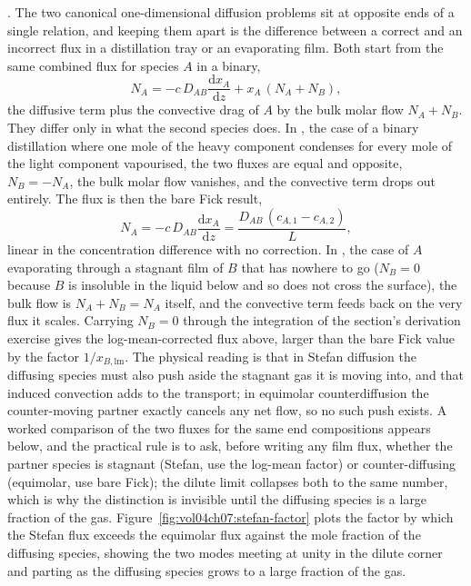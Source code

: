 . The two
canonical one-dimensional diffusion problems sit at opposite ends of a
single relation, and keeping them apart is the difference between a
correct and an incorrect flux in a distillation tray or an evaporating
film. Both start from the same combined flux for species $A$ in a binary,
\[
N_A = -c\,D_{AB}\frac{\mathrm{d}x_A}{\mathrm{d}z} + x_A\,(N_A + N_B),
\]
the diffusive term plus the convective drag of $A$ by the bulk molar
flow $N_A + N_B$. They differ only in what the second species does. In
, the case of a binary distillation
where one mole of the heavy component condenses for every mole of the
light component vapourised, the two fluxes are equal and opposite,
$N_B = -N_A$, the bulk molar flow vanishes, and the convective term drops
out entirely. The flux is then the bare Fick result,
\[
N_A = -c\,D_{AB}\frac{\mathrm{d}x_A}{\mathrm{d}z} =
\frac{D_{AB}\,(c_{A,1} - c_{A,2})}{L},
\]
linear in the concentration difference with no correction. In
, the case of $A$ evaporating through a
stagnant film of $B$ that has nowhere to go ($N_B = 0$ because $B$ is
insoluble in the liquid below and so does not cross the surface), the
bulk flow is $N_A + N_B = N_A$ itself, and the convective term feeds back
on the very flux it scales. Carrying $N_B = 0$ through the integration of
the section's derivation exercise gives the log-mean-corrected flux
above, larger than the bare Fick value by the factor $1/x_{B,\text{lm}}$.
The physical reading is that in Stefan diffusion the diffusing species
must also push aside the stagnant gas it is moving into, and that induced
convection adds to the transport; in equimolar counterdiffusion the
counter-moving partner exactly cancels any net flow, so no such push
exists. A worked comparison of the two fluxes for the same end
compositions appears below, and the practical rule is to ask, before
writing any film flux, whether the partner species is stagnant (Stefan,
use the log-mean factor) or counter-diffusing (equimolar, use bare
Fick); the dilute limit collapses both to the same number, which is why
the distinction is invisible until the diffusing species is a large
fraction of the gas. Figure~\ref{fig:vol04ch07:stefan-factor} plots the
factor by which the Stefan flux exceeds the equimolar flux against the
mole fraction of the diffusing species, showing the two modes meeting at
unity in the dilute corner and parting as the diffusing species grows to a
large fraction of the gas.

